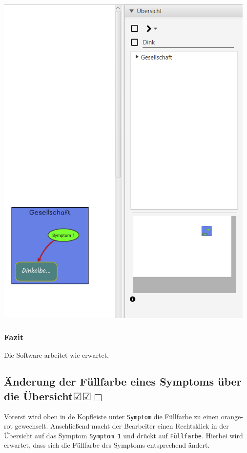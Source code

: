 \documentclass[enabledeprecatedfontcommands]{scrartcl}
\newcommand{\subsectiont}[2]{\subsection[#1]{#1{\normalsize\normalfont #2}}}
\newcommand{\leer}{$\Box$}
\newcommand{\ok}{$\CheckedBox$}
\begin{document}
\begin{center}
\includegraphics[height=17cm]{relationArtNachher.PNG}
\end{center}
\subsubsection{Fazit}
Die Software arbeitet wie erwartet.
\newpage
\subsectiont{Änderung der Füllfarbe eines Symptoms über die Übersicht}{\dotfill\ok\ok\leer}
Vorerst wird oben in de Kopfleiste unter \texttt{Symptom} die Füllfarbe zu einen orange-rot gewechselt. Anschließend macht der Bearbeiter einen Rechtsklick in der Übersicht auf das Symptom \texttt{Symptom 1} und drückt auf \texttt{Füllfarbe}. Hierbei wird erwartet, dass sich die Füllfarbe des Symptoms entsprechend ändert.  
\end{document}
